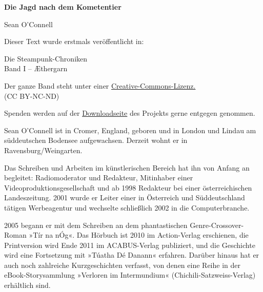 \usepackage[ngerman]{babel}
\usepackage[T1]{fontenc}



\newcommand\bigpar\medskip
\newcommand\gedanke\textit


\raggedbottom
\begin{center}
\textbf{\huge\textsf{Die Jagd nach dem Kometentier}}

\bigskip
Sean O'Connell

\end{center}

\bigskip

\begin{flushleft}
Dieser Text wurde erstmals veröffentlicht in:
\begin{center}
Die Steampunk-Chroniken\\
Band I -- Æthergarn
\end{center}

\bigskip

Der ganze Band steht unter einer
\href{http://creativecommons.org/licenses/by-nc-nd/2.0/de/}{Creative-Commons-Lizenz.} \\
(CC BY-NC-ND)

\bigskip

Spenden werden auf der
\href{http://steampunk-chroniken.de/download}{Downloadseite}
des Projekts gerne entgegen genommen.
\end{flushleft}
\vfill


Sean O'Connell ist in Cromer, England, geboren und in London und
Lindau am süddeutschen Bodensee aufgewachsen. Derzeit wohnt er in
Ravensburg/Weingarten.

Das Schreiben und Arbeiten im künstlerischen Bereich hat ihn von
Anfang an begleitet: Radiomoderator und Redakteur, Mitinhaber einer
Videoproduktionsgesellschaft und ab 1998 Redakteur bei einer
österreichischen Landeszeitung. 2001 wurde er Leiter einer in
Österreich und Süddeutschland tätigen Werbeagentur und wechselte
schließlich 2002 in die Computerbranche.

2005 begann er mit dem Schreiben an dem phantastischen
Genre-Crossover-Roman »Tír na nÓg«. Das Hörbuch ist 2010 im
Action-Verlag erschienen, die Printversion wird Ende 2011 im
ACABUS-Verlag publiziert, und die Geschichte wird eine Fortsetzung
mit »Túatha Dé Danann« erfahren. Darüber hinaus hat er auch noch
zahlreiche Kurzgeschichten verfasst, von denen eine Reihe in der
eBook-Storysammlung »Verloren im Intermundium«
(Chichili-Satzweiss-Verlag) erhältlich sind.

